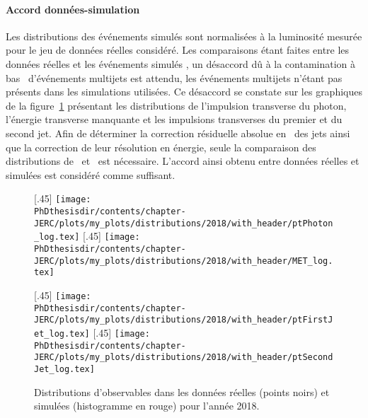 \paragraph{Accord données-simulation}
Les distributions des événements simulés sont normalisées à la luminosité mesurée pour le jeu de données réelles considéré.
Les comparaisons étant faites entre les données réelles et les événements simulés \Gjets, un désaccord dû à la contamination à bas \pT\ d'événements multijets est attendu, les événements multijets n'étant pas présents dans les simulations utilisées.
Ce désaccord se constate sur les graphiques de la figure~\ref{fig-distribs_Gjets_17UL} présentant les distributions de l'impulsion transverse du photon, l'énergie transverse manquante et les impulsions transverses du premier et du second jet.
Afin de déterminer la correction résiduelle absolue en \pT\ des jets ainsi que la correction de leur résolution en énergie, seule la comparaison des distributions de \Rbal\ et \RMPF\ est nécessaire.
L'accord ainsi obtenu entre données réelles et simulées est considéré comme suffisant.
\begin{figure}[h]
\centering
{}[.45\textwidth]
{\texttt{[image: \\PhDthesisdir/contents/chapter-JERC/plots/my\_plots/distributions/2018/with\_header/ptPhoton\_log.tex]}}
\hfill
{}[.45\textwidth]
{\texttt{[image: \\PhDthesisdir/contents/chapter-JERC/plots/my\_plots/distributions/2018/with\_header/MET\_log.tex]}}

\vspace{\baselineskip}

[.45\textwidth]
{\texttt{[image: \\PhDthesisdir/contents/chapter-JERC/plots/my\_plots/distributions/2018/with\_header/ptFirstJet\_log.tex]}}
\hfill
{}[.45\textwidth]
{\texttt{[image: \\PhDthesisdir/contents/chapter-JERC/plots/my\_plots/distributions/2018/with\_header/ptSecondJet\_log.tex]}}

\caption[Observables d'événements \Gjets\ en 2018.]{Distributions d'observables dans les données réelles (points noirs) et simulées (histogramme en rouge) pour l'année 2018.}
\label{fig-distribs_Gjets_17UL}
\end{figure}
